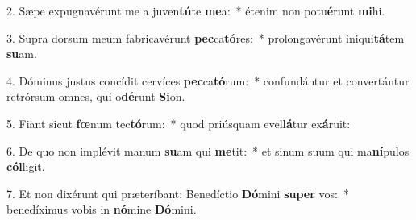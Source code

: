 2. Sæpe expugnavérunt me a juven\textbf{tú}te \textbf{me}a:~*  étenim non potu\textbf{é}runt \textbf{mi}hi.\

3. Supra dorsum meum fabricavérunt \textbf{pec}ca\textbf{tó}res:~*  prolongavérunt iniqui\textbf{tá}tem \textbf{su}am.\

4. Dóminus justus concídit cervíces \textbf{pec}ca\textbf{tó}rum:~*  confundántur et convertántur retrórsum omnes, qui o\textbf{dé}runt \textbf{Si}on.\

5. Fiant sicut \textbf{fœ}num tec\textbf{tó}rum:~*  quod priúsquam evel\textbf{lá}tur ex\textbf{á}ruit:\

6. De quo non implévit manum \textbf{su}am qui \textbf{me}tit:~*  et sinum suum qui ma\textbf{ní}pulos \textbf{cól}ligit.\

7. Et non dixérunt qui præteríbant: Benedíctio \textbf{Dó}mini \textbf{su}\textbf{per} vos:~*  benedíximus vobis in \textbf{nó}mine \textbf{Dó}mini.\

